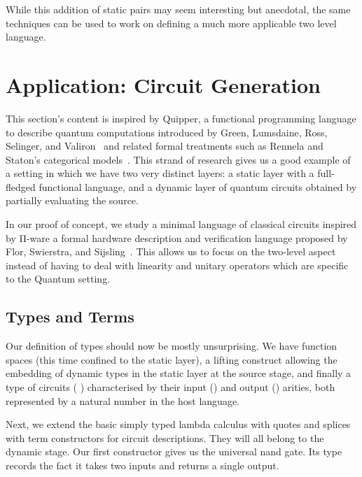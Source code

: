 While this addition of static pairs may seem interesting
but anecdotal, the same techniques can be used to work on
defining a much more applicable two level language.

\section{Application: Circuit Generation}\label{sec:circuits}

This section's content is inspired by Quipper, a functional
programming language to describe quantum computations
introduced by Green, Lumsdaine, Ross, Selinger, and
Valiron~\cite{DBLP:conf/rc/GreenLRSV13} and related
formal treatments such as Rennela and Staton's categorical
models~\cite{DBLP:journals/lmcs/RennelaS19}.
%
This strand of research gives us a good example of a setting in which
we have two very distinct layers: a static layer with a
full-fledged functional language, and a dynamic layer of
quantum circuits obtained by partially evaluating the source.

In our proof of concept, we study a minimal language of
classical circuits inspired by Π-ware a formal hardware
description and verification language proposed by
Flor, Swierstra, and Sijsling~\cite{DBLP:conf/types/FlorSS15}.
%
This allows us to focus on the two-level aspect instead of
having to deal with linearity and unitary operators which are
specific to the Quantum setting.

\subsection{Types and Terms}

Our definition of types should now be mostly unsurprising.
We have function spaces (this time confined to the static
layer), a lifting construct allowing the embedding of
dynamic types in the static layer at the source stage,
and finally a type of circuits
(    ) characterised by
their input () and output () arities,
both represented by a natural number in the host language.


Next, we extend the basic simply typed lambda calculus with
quotes and splices with term constructors for circuit descriptions.
They will all belong to the dynamic stage.
%
Our first constructor gives us the universal nand gate.
Its type records the fact it takes two inputs and returns
a single output.


